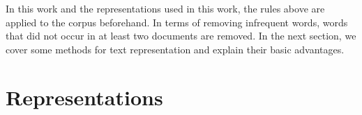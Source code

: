 




In this work and the representations used in this work, the  rules above are applied to the corpus beforehand. %
In terms of removing infrequent words, words that did not occur in at least two documents are removed.  %
In the next section, we cover some  methods for text representation and explain their basic advantages.  %

\section{Representations}\label{ch2:representations}



